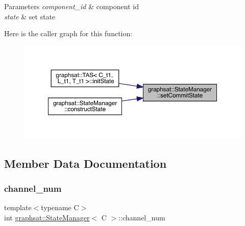 \begin{DoxyParams}{Parameters}
{\em component\+\_\+id} & component id \\
\hline
{\em state} & set state \\
\hline
\end{DoxyParams}
Here is the caller graph for this function\+:
\nopagebreak
\begin{figure}[H]
\begin{center}
\leavevmode
\includegraphics[width=350pt]{classgraphsat_1_1_state_manager_ac0db1dbde0e7c49cd9556d6f70157fa6_icgraph}
\end{center}
\end{figure}


\subsection{Member Data Documentation}
\mbox{\label{classgraphsat_1_1_state_manager_abf48c9171dfb81d38b5b45f052b75f5c}} 
\subsubsection{\texorpdfstring{channel\_num}{channel\_num}}
{\footnotesize\ttfamily template$<$typename C$>$ \\
int \mbox{\hyperlink{classgraphsat_1_1_state_manager}{graphsat\+::\+State\+Manager}}$<$ C $>$\+::channel\+\_\+num\hspace{0.3cm}{\ttfamily [private]}}

\mbox{\label{classgraphsat_1_1_state_manager_a4929a01d210fbd2fe697f3714b8b9b25}} 
